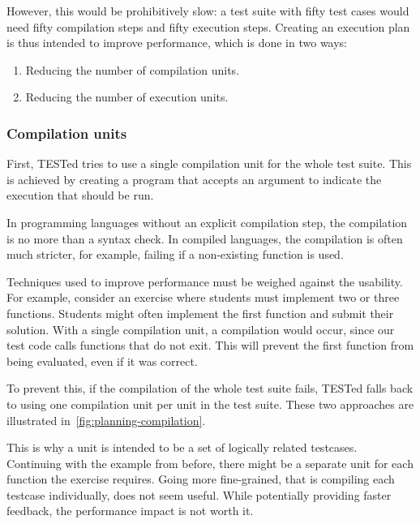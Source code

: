 \documentclass[../main]{subfiles}
\begin{document}
However, this would be prohibitively slow: a test suite with fifty test cases would need fifty compilation steps and fifty execution steps.
Creating an execution plan is thus intended to improve performance, which is done in two ways:

\begin{enumerate}
    \item Reducing the number of compilation units.
    \item Reducing the number of execution units.
\end{enumerate}

\subsubsection{Compilation units}
\label{subsubsec:compilation-units}

First, TESTed tries to use a single compilation unit for the whole test suite.
This is achieved by creating a program that accepts an argument to indicate the execution that should be run.

In programming languages without an explicit compilation step, the compilation is no more than a syntax check.
In compiled languages, the compilation is often much stricter, for example, failing if a non-existing function is used.

Techniques used to improve performance must be weighed against the usability.
For example, consider an exercise where students must implement two or three functions.
Students might often implement the first function and submit their solution.
With a single compilation unit, a compilation would occur, since our test code calls functions that do not exit.
This will prevent the first function from being evaluated, even if it was correct.

To prevent this, if the compilation of the whole test suite fails, TESTed falls back to using one compilation unit per unit in the test suite.
These two approaches are illustrated in~\cref{fig:planning-compilation}.

This is why a unit is intended to be a set of logically related testcases.
Continuing with the example from before, there might be a separate unit for each function the exercise requires.
Going more fine-grained, that is compiling each testcase individually, does not seem useful.
While potentially providing faster feedback, the performance impact is not worth it.
\end{document}

